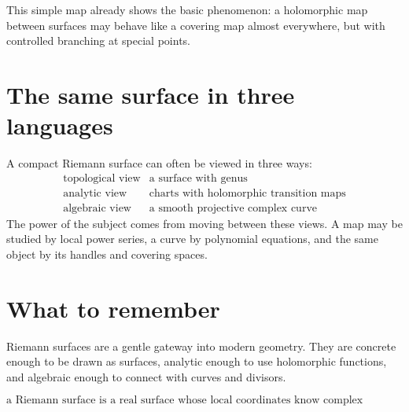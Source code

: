 This simple map already shows the basic phenomenon: a holomorphic map between surfaces may behave like a covering map almost everywhere, but with controlled branching at special points.



\section{The same surface in three languages}

A compact Riemann surface can often be viewed in three ways:
\[
\begin{array}{c|c}
\text{topological view} & \text{a surface with genus}\\
\text{analytic view} & \text{charts with holomorphic transition maps}\\
\text{algebraic view} & \text{a smooth projective complex curve}
\end{array}
\]
The power of the subject comes from moving between these views.  A map may be studied by local power series, a curve by polynomial equations, and the same object by its handles and covering spaces.


\section{What to remember}

Riemann surfaces are a gentle gateway into modern geometry. They are concrete enough to be drawn as surfaces, analytic enough to use holomorphic functions, and algebraic enough to connect with curves and divisors.

\[
  \text{a Riemann surface is a real surface whose local coordinates know complex analysis.}
\]
